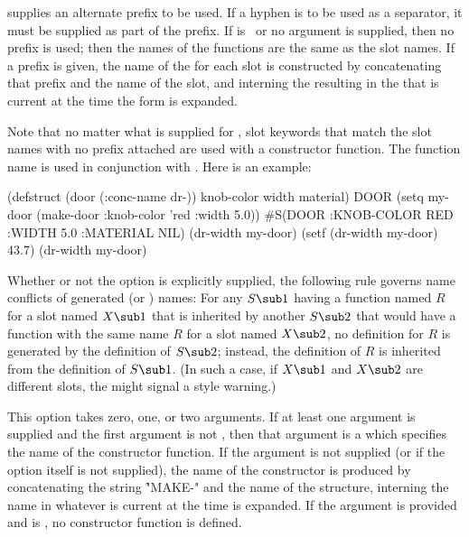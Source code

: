  supplies an alternate
prefix to be used.  If a hyphen is to be used as a separator,
it must be supplied as part of the prefix.
If  is \nil\ or no argument is supplied, 
then no prefix is used;
then the names of the  functions
are the same as the slot names.
If a  prefix is given,
the name of the   for each slot is constructed by
concatenating that prefix and the name of the slot, and interning the resulting
 in the  that is current at the time the 
 form is expanded.

Note that no matter what is supplied for ,
slot keywords that match the slot names with no prefix attached are used
with a constructor function.
The  function name is used
in conjunction with .  Here is an example:

%

\code
 (defstruct (door (:conc-name dr-)) knob-color width material) \EV DOOR
 (setq my-door (make-door :knob-color 'red :width 5.0)) 
\EV #S(DOOR :KNOB-COLOR RED :WIDTH 5.0 :MATERIAL NIL)
 (dr-width my-door) 
 (setf (dr-width my-door) 43.7) 
 (dr-width my-door) 
\endcode

Whether or not the  option is explicitly supplied, 
the following rule governs name conflicts of generated 
(or ) names:
For any   $S\sub 1$ 
having a  function named $R$ for a slot named $X\sub 1$
that is inherited by another   $S\sub 2$ 
that would have a  function with the same name $R$ for a slot named $X\sub 2$,
no definition for $R$ is generated by the definition of $S\sub 2$;
instead, the definition of $R$ is inherited from the definition of $S\sub 1$.
(In such a case, if $X\sub 1$ and $X\sub 2$ are different slots,
the  might signal a style warning.)


This option takes zero, one, or two arguments.
If at least one argument is supplied and the first argument is not \nil, then
that argument is a  which specifies the name of the 
constructor function.  If the argument is not supplied (or if the option itself is not
supplied), the name of the constructor is produced by concatenating the
string \f{"MAKE-"} and the name of the structure, interning the name
in whatever  is current at the time 
is expanded.  If the argument is provided and is \nil,
no constructor function is defined.

